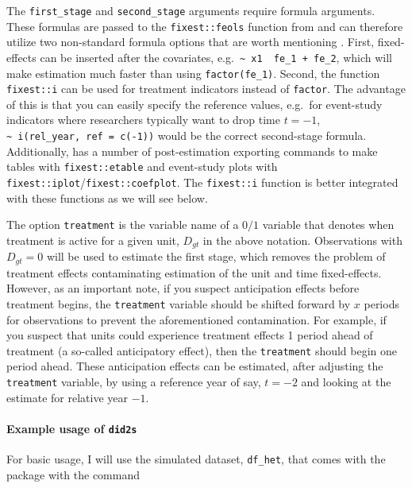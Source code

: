 The \texttt{first\_stage} and \texttt{second\_stage} arguments require
formula arguments. These formulas are passed to the
\texttt{fixest::feols} function from  and can therefore
utilize two non-standard formula options that are worth mentioning
\citep{Berge_2018}. First, fixed-effects can be inserted after the
covariates,
e.g.~\texttt{\textasciitilde{}\ x1\ \textbar{}\ fe\_1\ +\ fe\_2}, which
will make estimation much faster than using \texttt{factor(fe\_1)}.
Second, the function \texttt{fixest::i} can be used for treatment
indicators instead of \texttt{factor}. The advantage of this is that you
can easily specify the reference values, e.g.~for event-study indicators
where researchers typically want to drop time \(t = -1\),
\texttt{\textasciitilde{}\ i(rel\_year,\ ref\ =\ c(-1))} would be the
correct second-stage formula. Additionally,  has a
number of post-estimation exporting commands to make tables with
\texttt{fixest::etable} and event-study plots with
\texttt{fixest::iplot}/\texttt{fixest::coefplot}. The \texttt{fixest::i}
function is better integrated with these functions as we will see below.

The option \texttt{treatment} is the variable name of a \(0/1\) variable
that denotes when treatment is active for a given unit, \(D_{gt}\) in
the above notation. Observations with \(D_{gt} = 0\) will be used to
estimate the first stage, which removes the problem of treatment effects
contaminating estimation of the unit and time fixed-effects. However, as
an important note, if you suspect anticipation effects before treatment
begins, the \texttt{treatment} variable should be shifted forward by
\(x\) periods for observations to prevent the aforementioned
contamination. For example, if you suspect that units could experience
treatment effects 1 period ahead of treatment (a so-called anticipatory
effect), then the \texttt{treatment} should begin one period ahead.
These anticipation effects can be estimated, after adjusting the
\texttt{treatment} variable, by using a reference year of say,
\(t = -2\) and looking at the estimate for relative year \(-1\).

\hypertarget{example-usage-of-did2s}{%
\paragraph{\texorpdfstring{Example usage of
\texttt{did2s}}{Example usage of did2s}}\label{example-usage-of-did2s}}

For basic usage, I will use the simulated dataset, \texttt{df\_het},
that comes with the  package with the command

